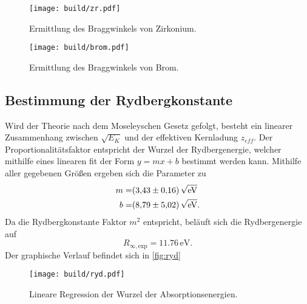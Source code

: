 \begin{figure}[H]
    \centering
    \caption{Ermittlung des Braggwinkels von Zirkonium.}
    \label{fig:}
    \texttt{[image: build/zr.pdf]}
\end{figure}

\begin{figure}[H]
    \centering
    \caption{Ermittlung des Braggwinkels von Brom.}
    \label{fig:}
    \texttt{[image: build/brom.pdf]}
\end{figure}


\subsection{Bestimmung der Rydbergkonstante}
Wird der Theorie nach dem Moseleyschen Gesetz gefolgt, besteht ein linearer 
Zusammenhang zwischen $\sqrt{E_K}$ und der effektiven Kernladung $z_{eff}$.
Der Proportionalitätsfaktor entspricht der Wurzel der Rydbergenergie, welcher 
mithilfe eines linearen fit der Form $y = mx + b$ bestimmt werden kann.
Mithilfe aller gegebenen Größen ergeben sich die Parameter zu
\begin{align*}
    m =& \qty{3.43 (0.16)}{\sqrt{eV}} \\
    b =& \qty{8.79 (5.02)}{\sqrt{eV}}.
\end{align*}
Da die Rydbergkonstante Faktor $m^2$ entspricht, beläuft sich die Rydbergenergie 
auf 
\begin{equation*}
    R_{\infty,\text{exp}} = 11.76\,\text{eV}.
\end{equation*}
Der graphische Verlauf befindet sich in \autoref{fig:ryd}
\begin{figure}[H]
    \centering
    \label{fig:ryd}
    \texttt{[image: build/ryd.pdf]}
    \caption{Lineare Regression der Wurzel der Absorptionsenergien.}
\end{figure}